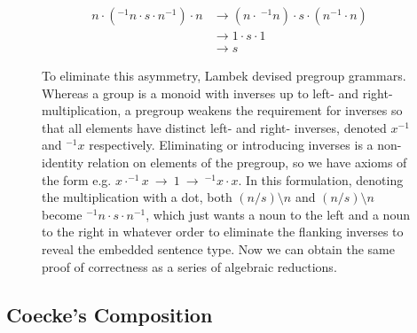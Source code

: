 \begin{figure}[h!]
\centering
{}
\caption{To eliminate this asymmetry, Lambek devised pregroup grammars. Whereas a group is a monoid with inverses up to left- and right-multiplication, a pregroup weakens the requirement for inverses so that all elements have distinct left- and right- inverses, denoted $x^{-1}$ and $^{-1}x$ respectively. Eliminating or introducing inverses is a non-identity relation on elements of the pregroup, so we have axioms of the form e.g. $x \cdot ^{-1}x \ \rightarrow \ 1 \ \rightarrow \ ^{-1}x \cdot x$. In this formulation, denoting the multiplication with a dot, both $(n/s)\setminus n$ and $(n/s)\setminus n$ become $^{-1}n \cdot s \cdot n^{-1}$, which just wants a noun to the left and a noun to the right in whatever order to eliminate the flanking inverses to reveal the embedded sentence type. Now we can obtain the same proof of correctness as a series of algebraic reductions.}


\begin{align}
n \cdot (^{-1}n \cdot s \cdot n^{-1}) \cdot n &\rightarrow (n \cdot \ ^{-1}n) \cdot s \cdot (n^{-1} \cdot n) \\
&\rightarrow 1 \cdot s \cdot 1 \\
&\rightarrow s
\end{align}

\end{figure}
\clearpage

\subsection{Coecke's Composition}

